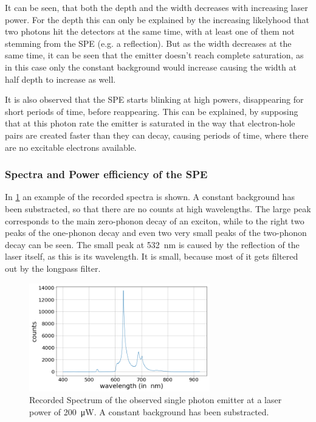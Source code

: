 It can be seen, that both the depth and the width decreases with increasing laser power.
For the depth this can only be explained by the increasing likelyhood that two photons hit the detectors at the same time, with at least one of them not stemming from the SPE (e.g. a reflection).
But as the width decreases at the same time, it can be seen that the emitter doesn't reach complete saturation, as in this case only the constant background would increase causing the width at half depth to increase as well.

It is also observed that the SPE starts blinking at high powers, disappearing for short periods of time, before reappearing.
This can be explained, by supposing that at this photon rate the emitter is saturated in the way that electron-hole pairs are created faster than they can decay, causing periods of time, where there are no excitable electrons available. %

\subsubsection{Spectra and Power efficiency of the SPE}

In \cref{fig_spe_spectrum_example} an example of the recorded spectra is shown.
A constant background has been substracted, so that there are no counts at high wavelengths.
The large peak corresponds to the main zero-phonon decay of an exciton, while to the right two peaks of the one-phonon decay and even two very small peaks of the two-phonon decay can be seen. %
The small peak at \SI{532}{nm} is caused by the reflection of the laser itself, as this is its wavelength.
It is small, because most of it gets filtered out by the longpass filter.

\begin{figure}[H]
    \centering
    \includegraphics[width=0.7\textwidth]{img/output_t2/spektrum_example_bgcorr_200.0muW.png}
    \caption{Recorded Spectrum of the observed single photon emitter at a laser power of \SI{200}{\micro W}. A constant background has been substracted.}
    \label{fig_spe_spectrum_example}
\end{figure}

